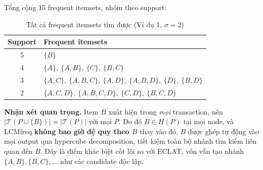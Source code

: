 \documentclass[12pt,a4paper]{article}
\newcommand{\cmark}{\ding{51}}
\theoremstyle{definition}
\begin{document}
Tổng cộng 15 frequent itemsets, nhóm theo support:

\begin{table}[H]
\centering
\begin{tabular}{c l}
    \toprule
    \textbf{Support} & \textbf{Frequent itemsets} \\
    \midrule
    5 & $\{B\}$ \\
    4 & $\{A\},\ \{A,B\},\ \{C\},\ \{B,C\}$ \\
    3 & $\{A,C\},\ \{A,B,C\},\ \{A,D\},\ \{A,B,D\},\ \{D\},\ \{B,D\}$ \\
    2 & $\{A,C,D\},\ \{A,B,C,D\},\ \{C,D\},\ \{B,C,D\}$ \\
    \bottomrule
\end{tabular}
\caption{Tất cả frequent itemsets tìm được (Ví dụ 1, $\sigma=2$)}
\label{tab:ex1_result}
\end{table}

\noindent\textbf{Nhận xét quan trọng.} Item $B$ xuất hiện trong
\emph{mọi} transaction, nên $|\mathcal{T}(P \cup \{B\})| =
|\mathcal{T}(P)|$ với mọi $P$. Do đó $B \in H(P)$ tại mọi node,
và LCMfreq \textbf{không bao giờ đệ quy theo $B$}  thay vào đó,
$B$ được ghép tự động vào mọi output qua hypercube decomposition,
tiết kiệm toàn bộ nhánh tìm kiếm liên quan đến $B$.
Đây là điểm khác biệt cốt lõi so với ECLAT, vốn vẫn tạo nhánh
$\{A,B\},\{B,C\},\ldots$ như các candidate độc lập.


\end{document}
